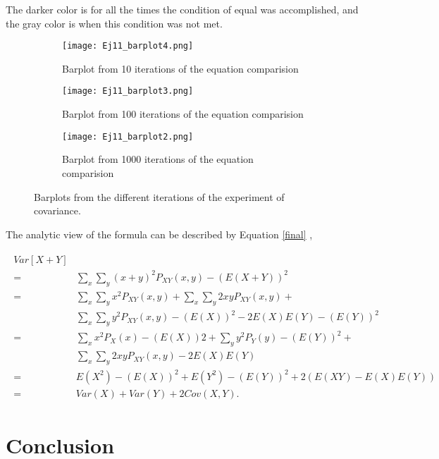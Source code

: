 \documentclass{article}
\begin{document}
The darker color is for all the times the condition of equal was accomplished, and the gray color is when this condition was not met.\\

\begin{figure}[]
\centering
\begin{subfigure}{.76\textwidth}
  \centering
  \texttt{[image: Ej11\_barplot4.png]}  
  \caption{Barplot from 10 iterations of the equation comparision }
  \label{s1}
\end{subfigure}
\newline
\begin{subfigure}{.76\textwidth}
  \centering
  \texttt{[image: Ej11\_barplot3.png]}  
  \caption{Barplot from 100 iterations of the equation comparision }
  \label{s2}
\end{subfigure}
\newline
\begin{subfigure}{.76\textwidth}
  \centering
  \texttt{[image: Ej11\_barplot2.png]}  
  \caption{Barplot from 1000 iterations of the equation comparision }
  \label{s3}
\end{subfigure}
	\caption{Barplots from the different iterations of the experiment of covariance.}
\label{cov}
\end{figure}

The analytic view of the formula can be described by Equation \ref{final} \cite{cova},

\begin{eqnarray}
\label{final}
\begin{split}
Var[X + Y] &\\
=  &\sum_x \sum_y (x+y)^2 P_{XY}(x, y)- (E(X+Y))^2\\
= & \sum_x \sum_y x^2 P_{XY}(x, y) +  \sum_x \sum_y 2xyP_{XY}(x, y) + \\
& \sum_x \sum_y y^2 P_{XY}(x,y) - (E(X))^2 - 2E(X)E(Y)- (E(Y))^2 \\
= &\sum_x x^2 P_{X}(x)-(E(X))2 + \sum_y y^2P_{Y}(y) - (E(Y))^2 +  \\
&\sum_x \sum_y 2xyP_{XY}(x, y) - 2E(X)E(Y)\\
 =& E(X^2) - (E(X))^2 + E(Y^2) - (E(Y))^2 + 2(E(XY)- E(X)E(Y)) \\
 = & Var(X) + Var(Y) + 2Cov(X, Y).
\end{split}
\end{eqnarray}

\section{Conclusion}
\end{document}
